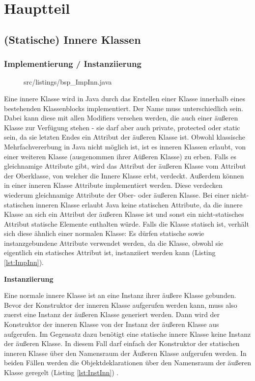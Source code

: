 \chapter{Hauptteil}
\section{(Statische) Innere Klassen}
\subsection {Implementierung / Instanziierung}

\begin{figure}[hbt]
\lstset{language=Java}
 {src/listings/bsp_ImpInn.java}
\end{figure}

Eine innere Klasse wird in Java durch das Erstellen einer Klasse innerhalb eines bestehenden Klassenblocks implementiert.
Der Name muss unterschiedlich sein. Dabei kann diese mit allen Modifiers versehen werden, die auch einer äußeren Klasse zur Verfügung stehen - sie darf aber auch private, protected oder static sein, da sie letzten Endes ein Attribut der äußeren Klasse ist.
Obwohl klassische Mehrfachvererbung in Java nicht möglich ist, ist es inneren Klassen erlaubt, von einer weiteren Klasse (ausgenommen ihrer Aüßeren Klasse) zu erben.
Falls es gleichnamige Attribute gibt, wird das Attribut der äußeren Klasse vom Attribut der Oberklasse, von welcher die Innere Klasse erbt, verdeckt.
Außerdem können in einer inneren Klasse Attribute implementiert werden. Diese verdecken wiederum gleichnamige Attribute der Ober- oder äußeren Klasse.
Bei einer nicht-statischen inneren Klasse erlaubt Java keine statischen Attribute, da die innere Klasse an sich ein Attribut der äußeren Klasse ist und sonst ein nicht-statisches Attribut statische Elemente enthalten würde.
Falls die Klasse statisch ist, verhält sich diese ähnlich einer normalen Klasse: Es dürfen statische sowie instanzgebundene Attribute verwendet werden, da die Klasse, obwohl sie eigentlich ein statisches Attribut ist, instanziiert werden kann (Listing \ref{lst:ImpInn}).


{\bf Instanziierung}

Eine normale innere Klasse ist an eine Instanz ihrer äußere Klasse gebunden. Bevor der Konstruktor der inneren Klasse aufgerufen werden kann, muss also zuerst eine Instanz der äußeren Klasse generiert werden.
Dann wird der Konstruktor der inneren Klasse von der Instanz der äußeren Klasse aus aufgerufen.
Im Gegensatz dazu benötigt eine statische innere Klasse keine Instanz der äußeren Klasse.
In diesem Fall darf einfach der Konstruktor der statischen inneren Klasse über den Namensraum der Äußeren Klasse aufgerufen werden.
In beiden Fällen werden die Objektdeklarationen über den Namensraum der äußeren Klasse geregelt (Listing \ref{lst:InstInn}) \cite{goll2013java}.

